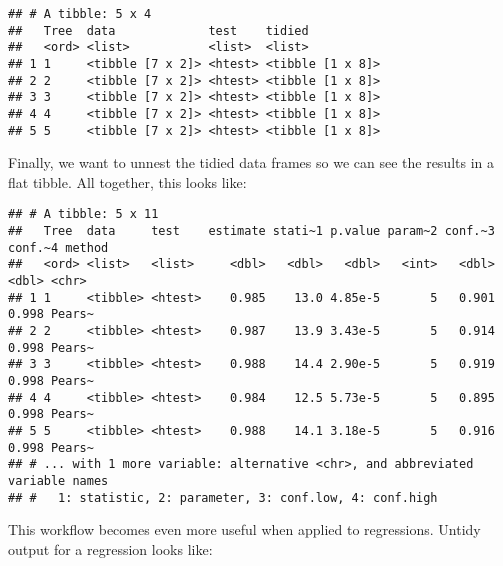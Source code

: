 \documentclass[
]{book}
\newenvironment{Shaded}{\begin{snugshade}}{\end{snugshade}}
\newcommand{\AttributeTok}[1]{\textcolor[rgb]{0.77,0.63,0.00}{#1}}
\newcommand{\CommentTok}[1]{\textcolor[rgb]{0.56,0.35,0.01}{\textit{#1}}}
\newcommand{\FunctionTok}[1]{\textcolor[rgb]{0.00,0.00,0.00}{#1}}
\newcommand{\NormalTok}[1]{#1}
\newcommand{\SpecialCharTok}[1]{\textcolor[rgb]{0.00,0.00,0.00}{#1}}
\begin{document}
\begin{verbatim}
## # A tibble: 5 x 4
##   Tree  data             test    tidied          
##   <ord> <list>           <list>  <list>          
## 1 1     <tibble [7 x 2]> <htest> <tibble [1 x 8]>
## 2 2     <tibble [7 x 2]> <htest> <tibble [1 x 8]>
## 3 3     <tibble [7 x 2]> <htest> <tibble [1 x 8]>
## 4 4     <tibble [7 x 2]> <htest> <tibble [1 x 8]>
## 5 5     <tibble [7 x 2]> <htest> <tibble [1 x 8]>
\end{verbatim}

Finally, we want to unnest the tidied data frames so we can see the results in a flat tibble. All together, this looks like:

\begin{Shaded}
\end{Shaded}

\begin{verbatim}
## # A tibble: 5 x 11
##   Tree  data     test    estimate stati~1 p.value param~2 conf.~3 conf.~4 method
##   <ord> <list>   <list>     <dbl>   <dbl>   <dbl>   <int>   <dbl>   <dbl> <chr> 
## 1 1     <tibble> <htest>    0.985    13.0 4.85e-5       5   0.901   0.998 Pears~
## 2 2     <tibble> <htest>    0.987    13.9 3.43e-5       5   0.914   0.998 Pears~
## 3 3     <tibble> <htest>    0.988    14.4 2.90e-5       5   0.919   0.998 Pears~
## 4 4     <tibble> <htest>    0.984    12.5 5.73e-5       5   0.895   0.998 Pears~
## 5 5     <tibble> <htest>    0.988    14.1 3.18e-5       5   0.916   0.998 Pears~
## # ... with 1 more variable: alternative <chr>, and abbreviated variable names
## #   1: statistic, 2: parameter, 3: conf.low, 4: conf.high
\end{verbatim}

This workflow becomes even more useful when applied to regressions. Untidy output for a regression looks like:
\end{document}
